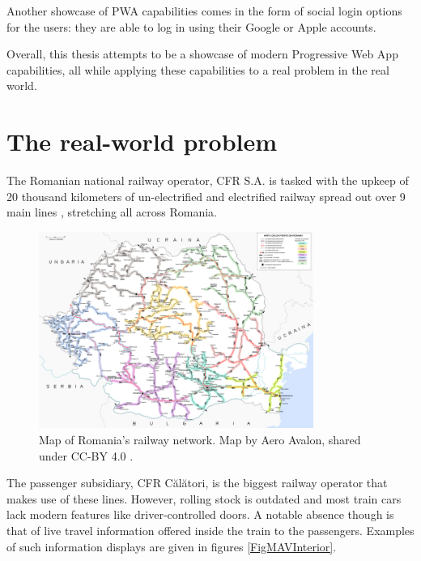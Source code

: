Another showcase of PWA capabilities comes in the form of social login options for the users: they are able to log in using their Google or Apple accounts.

Overall, this thesis attempts to be a showcase of modern Progressive Web App capabilities, all while applying these capabilities to a real problem in the real world.

\section{The real-world problem}
The Romanian national railway operator, CFR S.A. is tasked with the upkeep of 20 thousand kilometers of un-electrified and electrified railway spread out over 9 main lines \cite{CFROrdinMagistrale} \cite{WallstreetRoReorganizareSNCFR}, stretching all across Romania.

\begin{figure}[htbp]
    \centering
    \includegraphics[width=0.8\textwidth]{./figures/ch3_romania-feroviara.png}
    \caption{Map of Romania's railway network. Map by Aero Avalon, shared under CC-BY 4.0 \cite{WikipediaRomaniaFeroviara}.}
    \label{FigRomaniaFeroviara}
\end{figure}

The passenger subsidiary, CFR Călători, is the biggest railway operator that makes use of these lines. However, rolling stock is outdated and most train cars lack modern features like driver-controlled doors. A notable absence though is that of live travel information offered inside the train to the passengers. Examples of such information displays are given in figures \ref{FigMAVInterior}.

